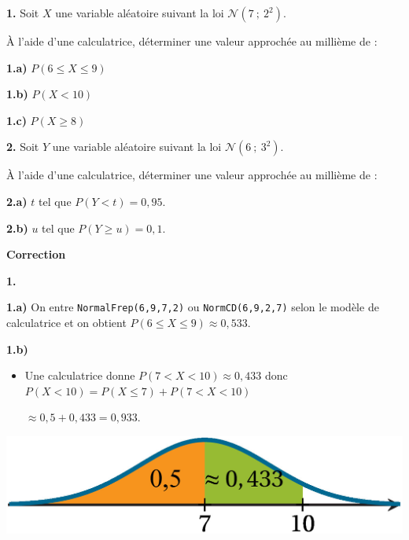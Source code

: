 \documentclass{cornouaille}
\begin{document}
\begin{methode}

\exercice\label{methode5SP2}




\textbf{1. } Soit $X$ une variable aléatoire suivant la loi $\mathcal{N}(7\ ;\ 2^2)$.


\`A l'aide d'une calculatrice, déterminer une valeur approchée au millième de :




\textbf{1.a) } $P(6\leqslant X\leqslant 9)$


\textbf{1.b) } $P(X<10)$


\textbf{1.c) } $P(X\geqslant 8)$




\textbf{2. } Soit $Y$ une variable aléatoire suivant la loi $\mathcal{N}(6\ ;\ 3^2)$.


\`A l'aide d'une calculatrice, déterminer une valeur approchée au millième de :




\textbf{2.a) } $t$ tel que $P(Y<t)=0,95$.


\textbf{2.b) } $u$ tel que $P(Y\geqslant u)=0,1$.




\textbf{Correction}




\textbf{1. }




\textbf{1.a) } On entre \verb"NormalFrep(6,9,7,2)" ou \verb"NormCD(6,9,2,7)"
selon le modèle de calculatrice et on obtient $P(6\leqslant X\leqslant 9)\approx 0,533$.


\textbf{1.b) } ~~


\begin{minipage}{0.6\linewidth}

\begin{itemize}
\item Une calculatrice donne $P(7<X<10)\approx 0,433$ donc $P(X<10)=P(X\leqslant 7)+P(7<X<10)$

$\approx 0,5+0,433=0,933$.
\end{itemize}

\end{minipage}

\hfill

\begin{minipage}{0.4\linewidth}



\includegraphics{./TS-Variables-11}




\end{minipage}
\end{methode}
\end{document}
